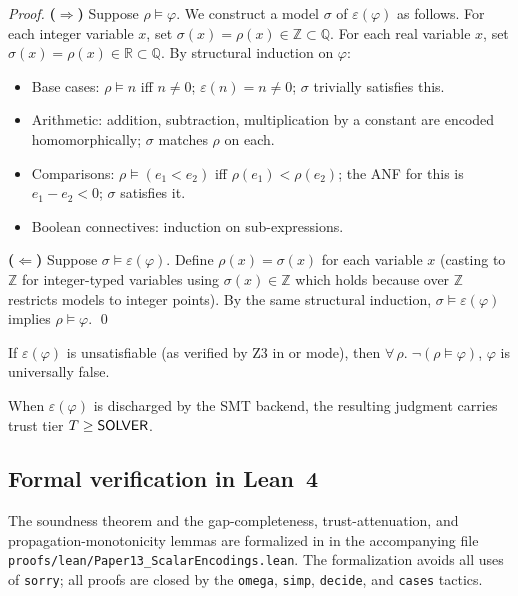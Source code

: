 \documentclass[11pt]{article}
\newcommand{\Enc}{\varepsilon}               %
\begin{document}
\begin{proof}
\textbf{($\Rightarrow$)}
Suppose $\rho \models \varphi$.
We construct a model $\sigma$ of $\Enc(\varphi)$ as follows.
For each integer variable $x$, set $\sigma(x) = \rho(x) \in \mathbb{Z}
\subset \mathbb{Q}$.
For each real variable $x$, set $\sigma(x) = \rho(x) \in \mathbb{R}
\subset \mathbb{Q}$.
By structural induction on $\varphi$:
\begin{itemize}[itemsep=0pt]
  \item Base cases: $\rho \models n$ iff $n \neq 0$; $\Enc(n) = n \neq 0$;
    $\sigma$ trivially satisfies this.
  \item Arithmetic: addition, subtraction, multiplication by a constant
    are encoded homomorphically; $\sigma$ matches $\rho$ on each.
  \item Comparisons: $\rho \models (e_1 < e_2)$ iff
    $\rho(e_1) < \rho(e_2)$; the ANF for this is
    $e_1 - e_2 < 0$; $\sigma$ satisfies it.
  \item Boolean connectives: induction on sub-expressions.
\end{itemize}

\textbf{($\Leftarrow$)}
Suppose $\sigma \models \Enc(\varphi)$.
Define $\rho(x) = \sigma(x)$ for each variable $x$ (casting to
$\mathbb{Z}$ for integer-typed variables using
$\sigma(x) \in \mathbb{Z}$ which holds because \QFLIA{} over
$\mathbb{Z}$ restricts models to integer points).
By the same structural induction, $\sigma \models \Enc(\varphi)$
implies $\rho \models \varphi$.
\qed
\end{proof}

\begin{corollary}\label{cor:unsat}
If $\Enc(\varphi)$ is unsatisfiable (as verified by Z3 in
\QFLIA{} or \QFLRA{} mode), then $\forall\,\rho.\;\neg(\rho
\models \varphi)$, \ie $\varphi$ is universally false.
\end{corollary}

\begin{corollary}\label{cor:trust}
When $\Enc(\varphi)$ is discharged by the SMT backend, the
resulting judgment carries trust tier $T \geq \mathsf{SOLVER}{}$.
\end{corollary}

\subsection{Formal verification in Lean~4}

The soundness theorem and the gap-completeness, trust-attenuation,
and propagation-monotonicity lemmas are formalized in
\LEAN{} in the accompanying file
\texttt{proofs/lean/Paper13\_ScalarEncodings.lean}.
The formalization avoids all uses of \texttt{sorry}; all proofs
are closed by the \texttt{omega}, \texttt{simp}, \texttt{decide},
and \texttt{cases} tactics.
\end{document}
